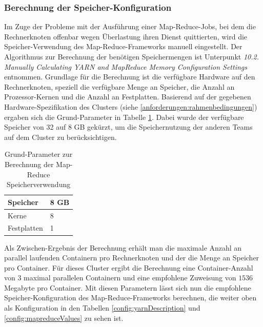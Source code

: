 \subsubsection{Berechnung der Speicher-Konfiguration}
Im Zuge der Probleme mit der Ausführung einer Map-Reduce-Jobs, bei dem die Rechnerknoten
offenbar wegen Überlastung ihren Dienst quittierten, wird die Speicher-Verwendung
des Map-Reduce-Frameworks manuell eingestellt. Der Algorithmus zur Berechnung der 
benötigen Speichermengen ist \cite{memoryCal} Unterpunkt \textit{ 10.2. Manually Calculating YARN and MapReduce Memory Configuration Settings} entnommen.
Grundlage für die Berechnung ist die verfügbare Hardware auf den Rechnerknoten, speziell
die verfügbare Menge an Speicher, die Anzahl an Prozessor-Kernen und die Anzahl an 
Festplatten. Basierend auf der gegebenen Hardware-Spezifikation des Clusters 
(siehe \ref{anforderungen:rahmenbedingungen}) ergaben sich die Grund-Parameter in Tabelle
\ref{config:memoryCalculation}.
Dabei wurde der verfügbare Speicher von 32 auf 8 GB gekürzt, um die Speichernutzung der
anderen Teams auf dem Cluster zu berücksichtigen.

\begin{table}
	\begin{tabularx}{\textwidth}{|X|X|} \hline
	Speicher & 8 GB \\ \hline
	Kerne & 8 \\ \hline
	Festplatten & 1 \\ \hline
	\end{tabularx}
	\caption{Grund-Parameter zur Berechnung der Map-Reduce Speicherverwendung}
	\label{config:memoryCalculation}
\end{table}

Als Zwischen-Ergebnis der Berechnung erhält man die maximale Anzahl an parallel laufenden 
Containern pro Rechnerknoten und der die Menge an Speicher pro Container. Für dieses Cluster
ergibt die Berechnung eine Container-Anzahl von $3$ maximal parallelen Containern und 
eine empfohlene Zuweisung von $1536$ Megabyte pro Container. Mit diesen Parametern lässt 
sich nun die empfohlene Speicher-Konfiguration des Map-Reduce-Frameworks berechnen, die
weiter oben als Konfiguration in den Tabellen \ref{config:yarnDescription} und
 \ref{config:mapreduceValues} zu sehen ist.
